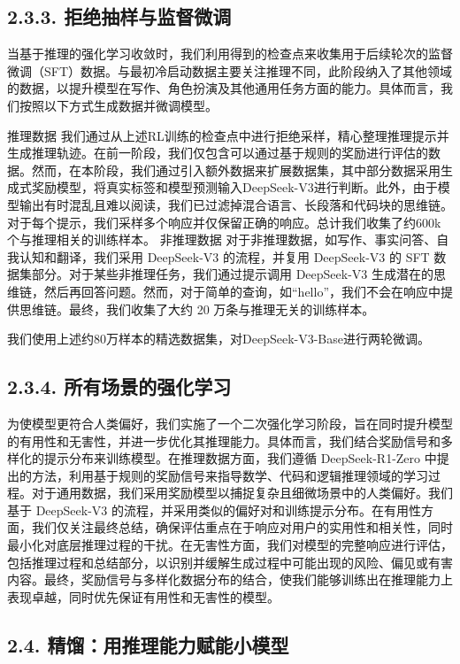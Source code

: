 \documentclass[12pt,a4paper]{report} %
\begin{document}
\subsection*{2.3.3. 拒绝抽样与监督微调}


当基于推理的强化学习收敛时，我们利用得到的检查点来收集用于后续轮次的监督微调（SFT）数据。与最初冷启动数据主要关注推理不同，此阶段纳入了其他领域的数据，以提升模型在写作、角色扮演及其他通用任务方面的能力。具体而言，我们按照以下方式生成数据并微调模型。


推理数据 我们通过从上述RL训练的检查点中进行拒绝采样，精心整理推理提示并生成推理轨迹。在前一阶段，我们仅包含可以通过基于规则的奖励进行评估的数据。然而，在本阶段，我们通过引入额外数据来扩展数据集，其中部分数据采用生成式奖励模型，将真实标签和模型预测输入DeepSeek-V3进行判断。此外，由于模型输出有时混乱且难以阅读，我们已过滤掉混合语言、长段落和代码块的思维链。对于每个提示，我们采样多个响应并仅保留正确的响应。总计我们收集了约600k个与推理相关的训练样本。
非推理数据 对于非推理数据，如写作、事实问答、自我认知和翻译，我们采用 DeepSeek-V3 的流程，并复用 DeepSeek-V3 的 SFT 数据集部分。对于某些非推理任务，我们通过提示调用 DeepSeek-V3 生成潜在的思维链，然后再回答问题。然而，对于简单的查询，如“hello”，我们不会在响应中提供思维链。最终，我们收集了大约 20 万条与推理无关的训练样本。


我们使用上述约80万样本的精选数据集，对DeepSeek-V3-Base进行两轮微调。


\subsection*{2.3.4. 所有场景的强化学习}


为使模型更符合人类偏好，我们实施了一个二次强化学习阶段，旨在同时提升模型的有用性和无害性，并进一步优化其推理能力。具体而言，我们结合奖励信号和多样化的提示分布来训练模型。在推理数据方面，我们遵循 DeepSeek-R1-Zero 中提出的方法，利用基于规则的奖励信号来指导数学、代码和逻辑推理领域的学习过程。对于通用数据，我们采用奖励模型以捕捉复杂且细微场景中的人类偏好。我们基于 DeepSeek-V3 的流程，并采用类似的偏好对和训练提示分布。在有用性方面，我们仅关注最终总结，确保评估重点在于响应对用户的实用性和相关性，同时最小化对底层推理过程的干扰。在无害性方面，我们对模型的完整响应进行评估，包括推理过程和总结部分，以识别并缓解生成过程中可能出现的风险、偏见或有害内容。最终，奖励信号与多样化数据分布的结合，使我们能够训练出在推理能力上表现卓越，同时优先保证有用性和无害性的模型。


\subsection*{2.4. 精馏：用推理能力赋能小模型}
\end{document}
